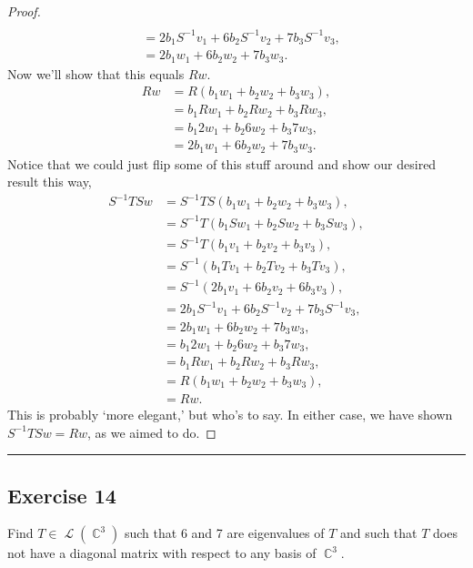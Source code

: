 \documentclass[letterpaper, 12pt]{amsart}
\DeclareMathOperator{\C}{\mathbb{C}}				%
\DeclareMathOperator{\Ell}{\mathscr{L}}				%
\theoremstyle{definition}  							%
\begin{document}
\begin{proof}
\begin{align*}
			\end{align*}
			\begin{align*}
				&= 2b_{1}S^{-1}v_{1} + 6b_{2}S^{-1}v_{2} + 7b_{3}S^{-1}v_{3}, \\
				&= 2b_{1}w_{1} + 6b_{2}w_{2} + 7b_{3}w_{3}.
			\end{align*}
		Now we'll show that this equals $Rw$.
			\begin{align*}
				Rw &= R(b_{1}w_{1} + b_{2}w_{2} + b_{3}w_{3}), \\
				&= b_{1}Rw_{1} + b_{2}Rw_{2} + b_{3}Rw_{3}, \\
				&= b_{1}2w_{1} + b_{2}6w_{2} + b_{3}7w_{3}, \\
				&= 2b_{1}w_{1} + 6b_{2}w_{2} + 7b_{3}w_{3}.
			\end{align*}
		Notice that we could just flip some of this stuff around and show our desired result this way,
			\begin{align*}
				S^{-1}TSw &= S^{-1}TS(b_{1}w_{1} + b_{2}w_{2} + b_{3}w_{3}), \\
				&= S^{-1} T(b_{1}Sw_{1} + b_{2}Sw_{2} + b_{3}Sw_{3}), \\
				&= S^{-1} T(b_{1}v_{1} + b_{2}v_{2} + b_{3}v_{3}), \\
				&= S^{-1}(b_{1}Tv_{1} + b_{2}Tv_{2} + b_{3}Tv_{3}), \\
				&= S^{-1}(2b_{1}v_{1} + 6b_{2}v_{2} + 6b_{3}v_{3}), \\
				&= 2b_{1}S^{-1}v_{1} + 6b_{2}S^{-1}v_{2} + 7b_{3}S^{-1}v_{3}, \\
				&= 2b_{1}w_{1} + 6b_{2}w_{2} + 7b_{3}w_{3}, \\
				&= b_{1}2w_{1} + b_{2}6w_{2} + b_{3}7w_{3}, \\
				&= b_{1}Rw_{1} + b_{2}Rw_{2} + b_{3}Rw_{3}, \\
				&= R(b_{1}w_{1} + b_{2}w_{2} + b_{3}w_{3}), \\
				&= Rw.
			\end{align*}
		This is probably `more elegant,' but who's to say.
		In either case, we have shown $S^{-1}TSw = Rw$, as we aimed to do.
		\end{proof}

		\vspace*{2mm}
		\hrule
		\vspace*{2mm}

		\subsection*{Exercise 14}
		Find $T \in \Ell(\C^{3})$ such that 6 and 7 are eigenvalues of $T$ and such that $T$ does not have a diagonal matrix with respect to any basis of $\C^{3}$.
		\vspace*{3mm}
\end{document}
